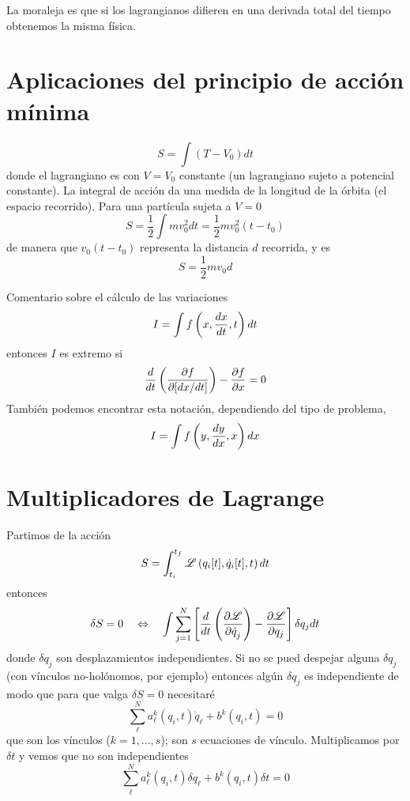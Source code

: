 \documentclass[10pt,oneside]{CBFT_book}
\begin{document}
La moraleja es que si los lagrangianos difieren en una derivada total del tiempo obtenemos la misma
física.

\section{Aplicaciones del principio de acción mínima}

\[
	S = \int (T-V_0) dt
\]
donde el lagrangiano es con $V=V_0$ constante (un lagrangiano sujeto a potencial constante).
La integral de acción da una medida de la longitud de la órbita (el espacio recorrido).
Para una partícula sujeta a $V=0$
\[
	S = \frac{1}{2}\int m v_0^2 dt = \frac{1}{2}mv_0^2(t-t_0)
\]
de manera que $v_0(t-t_0)$ representa la distancia $d$ recorrida, y es 
\[
	S = \frac{1}{2}mv_0 d
\]

Comentario sobre el cálculo de las variaciones
\[
	I = \int f\left(x, \frac{d^{\hspace{-0.05em}} {x}}{d {t}^{\hspace{-0.05em}}}, t\right) dt 
\]
entonces $I$ es extremo si
\[
	\frac{d}{dt} \left( \frac{\partial^{\hspace{-0.05em}} {f}}{\partial {[dx/dt]}^{\hspace{-0.05em}}}\right) - \frac{\partial^{\hspace{-0.05em}} {f}}{\partial {x}^{\hspace{-0.05em}}} = 0
\]
También podemos encontrar esta notación, dependiendo del tipo de problema,
\[
	I = \int f\left(y, \frac{d^{\hspace{-0.05em}} {y}}{d {x}^{\hspace{-0.05em}}}, x\right) dx 
\]


\section{Multiplicadores de Lagrange}

Partimos de la acción
\[
	S = \int_{t_i}^{t_f} \mathscr{L} \left( q_i[t], \dot{q}_i[t], t \right) dt
\]
entonces 
\[
	\delta S = 0 \quad \Leftrightarrow \quad \int
	\sum_{j=1}^{N} \left[ \frac{d}{dt}\left( \frac{\partial^{\hspace{-0.05em}} {\mathscr{L}}}{\partial {\dot{q}_j}^{\hspace{-0.05em}}} \right) -
	\frac{\partial^{\hspace{-0.05em}} {\mathscr{L}}}{\partial {q_j}^{\hspace{-0.05em}}} \right]\delta q_j dt
\]
donde $\delta q_j$ son desplazamientos independientes. Si no se pued despejar alguna $\delta q_j$ (con 
vínculos no-holónomos, por ejemplo) entonces algún $\delta q_j$ es independiente de modo que para que 
valga $\delta S =0 $ necesitaré 
\[
	\sum_{\ell}^N a_\ell^k(q_i,t) \dot{q}_\ell + b^k(q_i,t) = 0
\]
que son los vínculos ($k=1,...,s$); son $s$ ecuaciones de vínculo.
Multiplicamos por $\delta t$ y vemos que no son independientes
\[
	\sum_{\ell}^N a_\ell^k(q_i,t) \delta {q}_\ell + b^k(q_i,t) \delta t= 0
\]
\end{document}
